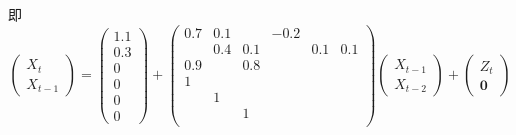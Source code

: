 \documentclass[cn]{homework}
\begin{document}
\begin{subproblem}[(\alph*)]
        即
        \[\begin{pmatrix}
            X_t\\
            X_{t-1}
        \end{pmatrix}
        =\begin{pmatrix}
            1.1\\
            0.3\\
            0   \\
            0   \\
            0   \\
            0
        \end{pmatrix}
        +\begin{pmatrix}
            0.7 & 0.1 &     & -0.2 &     &     \\
                & 0.4 & 0.1 &      & 0.1 & 0.1 \\
            0.9 &     & 0.8 &      &     &     \\
            1   &     &     &      &     &     \\
                & 1   &     &      &     &     \\
                &     & 1   &      &     &     \\
        \end{pmatrix}
        \begin{pmatrix}
            X_{t-1}\\
            X_{t-2}
        \end{pmatrix}
        +\begin{pmatrix}
            Z_t\\
            \boldsymbol 0
        \end{pmatrix}\]
    \end{subproblem}
\end{document}
